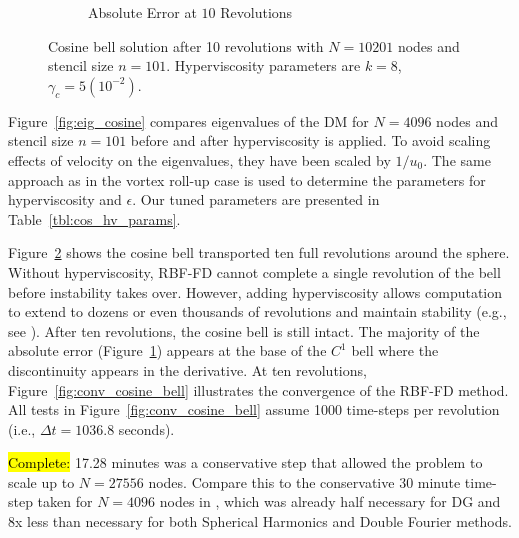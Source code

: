 \documentclass{report}
\begin{document}
\begin{figure}[ht!]
\begin{center}
\begin{subfigure}[b]{0.45\textwidth}
	\caption{Absolute Error at $10$ Revolutions}
	\label{fig:cosine_abserror}
\end{subfigure}
\caption{Cosine bell solution after 10 revolutions with $N=10201$ nodes and stencil size $n=101$.
Hyperviscosity parameters are $k = 8$, $\gamma_c = 5(10^{-2})$. 
}
 \label{fig:cosine_10revs}
\end{center}
\end{figure}

Figure~\ref{fig:eig_cosine} compares eigenvalues of the DM for $N=4096$ nodes and stencil size $n=101$ before and after hyperviscosity is applied. To avoid scaling effects of velocity on the eigenvalues, they have been scaled by $1/u_0$.  The same approach as in the vortex roll-up case is used to determine the parameters for hyperviscosity and $\epsilon$. Our tuned parameters are presented in 
Table~\ref{tbl:cos_hv_params}.


Figure~\ref{fig:cosine_10revs} shows the cosine bell transported ten full revolutions around the sphere. Without hyperviscosity, RBF-FD cannot complete a single revolution of the bell before instability takes over. However, adding hyperviscosity allows computation to extend to dozens or even thousands of revolutions and maintain stability (e.g., see \cite{FornbergLehto11}). After ten revolutions, the cosine bell is still intact. The majority of the absolute error (Figure~\ref{fig:cosine_abserror}) appears at the base of the $C^1$ bell where the discontinuity appears in the derivative. At ten revolutions, Figure~\ref{fig:conv_cosine_bell} illustrates the convergence of the RBF-FD method. All tests in Figure~\ref{fig:conv_cosine_bell} assume 1000 time-steps per revolution (i.e., $\Delta t = 1036.8$ seconds). 


\hl{Complete:}
17.28 minutes was a conservative step that allowed the problem to scale up to $N=27556$ nodes. Compare this to the conservative 30 minute time-step taken for $N=4096$ nodes in \cite{FlyerWright07}, which was already half necessary for DG and 8x less than necessary for both Spherical Harmonics and Double Fourier methods. 
\end{document}
